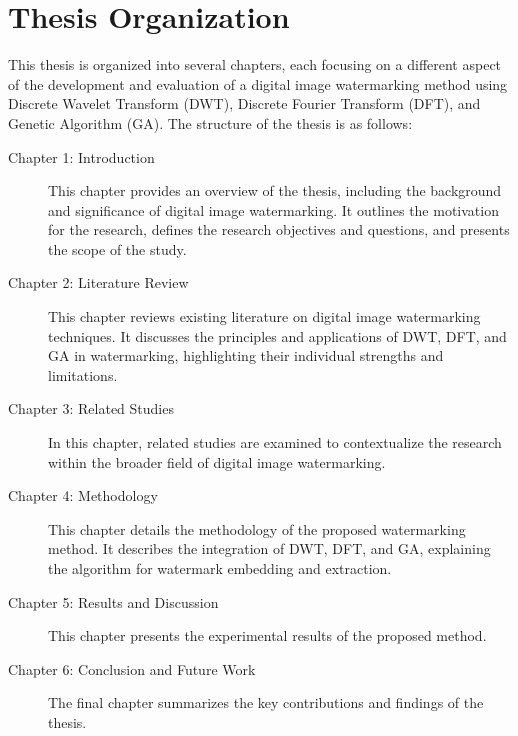 \section{Thesis Organization}

This thesis is organized into several chapters, each focusing on a different aspect of the development and evaluation of a digital image watermarking method using Discrete Wavelet Transform (DWT), Discrete Fourier Transform (DFT), and Genetic Algorithm (GA). The structure of the thesis is as follows:

\begin{description}
    \item[Chapter 1: Introduction] This chapter provides an overview of the thesis, including the background and significance of digital image watermarking. It outlines the motivation for the research, defines the research objectives and questions, and presents the scope of the study.
    
    \item[Chapter 2: Literature Review] This chapter reviews existing literature on digital image watermarking techniques. It discusses the principles and applications of DWT, DFT, and GA in watermarking, highlighting their individual strengths and limitations.
    
    \item[Chapter 3: Related Studies] In this chapter, related studies are examined to contextualize the research within the broader field of digital image watermarking.
    
    \item[Chapter 4: Methodology] This chapter details the methodology of the proposed watermarking method. It describes the integration of DWT, DFT, and GA, explaining the algorithm for watermark embedding and extraction.
    
    \item[Chapter 5: Results and Discussion] This chapter presents the experimental results of the proposed method.
    
    \item[Chapter 6: Conclusion and Future Work] The final chapter summarizes the key contributions and findings of the thesis.
\end{description}
